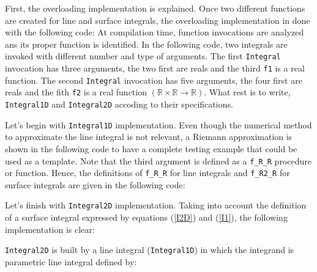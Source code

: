 First, the overloading implementation is explained. Once two different functions are 
created for line and surface integrals, the overloading implementation in done
with the following code: 
\vspace{0.5cm}  
At compilation time, function invocations are analyzed ans its proper function
is identified. In the following code, two integrals are invoked with 
different number and type of arguments.
\vspace{0.5cm} 
The first \texttt{Integral} invocation has three arguments, the two first are reals and the 
third \texttt{f1} is a real function.
The second \texttt{Integral} invocation has five arguments, the four first are reals and 
the fith \texttt{f2} is a real function 
$(\mathbb{R}\times \mathbb{R} \rightarrow \mathbb{R})$.
What rest is to write, \texttt{Integral1D} and \texttt{Integral2D} accoding to their 
specifications.  
\newpage  

Let's begin with  \verb|Integral1D| implementation. 
Even though the numerical method to approximate the line integral is not relevant, 
a Riemann approximation is shown in the following code to have a complete testing
example that could be used as a template. 
\vspace{0.5cm} 
Note that the third argument is defined as a \verb|f_R_R| procedure or function. 
Hence, the definitions of \verb|f_R_R| for line integrals and \verb|f_R2_R|
for surface integrals are given in the following code: 
\vspace{0.5cm} 
 
\newpage  
Let's finish with \verb|Integral2D| implementation. 
Taking into account the definition of a surface integral expressed 
by  equations (\ref{I2D}) and (\ref{I1}), the following implementation is clear: 

\vspace{0.5cm}  
\verb|Integral2D|  is built by a line integral (\verb|Integral1D|) 
in which the integrand is parametric line integral defined by: 
\vspace{0.5cm}   
    
